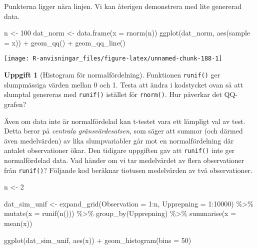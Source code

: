 \documentclass[
]{book}
\newenvironment{Shaded}{\begin{snugshade}}{\end{snugshade}}
\newcommand{\AttributeTok}[1]{\textcolor[rgb]{0.77,0.63,0.00}{#1}}
\newcommand{\DecValTok}[1]{\textcolor[rgb]{0.00,0.00,0.81}{#1}}
\newcommand{\FunctionTok}[1]{\textcolor[rgb]{0.00,0.00,0.00}{#1}}
\newcommand{\NormalTok}[1]{#1}
\newcommand{\OtherTok}[1]{\textcolor[rgb]{0.56,0.35,0.01}{#1}}
\newcommand{\SpecialCharTok}[1]{\textcolor[rgb]{0.00,0.00,0.00}{#1}}
\theoremstyle{definition}
\theoremstyle{definition}
\theoremstyle{definition}
\newtheorem{exercise}{Uppgift}[chapter]
\theoremstyle{definition}
\theoremstyle{remark}
\begin{document}
Punkterna ligger nära linjen. Vi kan återigen demonstrera med lite genererad data.

\begin{Shaded}
\begin{Highlighting}[]
\NormalTok{n }\OtherTok{\textless{}{-}} \DecValTok{100}
\NormalTok{dat\_norm }\OtherTok{\textless{}{-}} \FunctionTok{data.frame}\NormalTok{(}\AttributeTok{x =} \FunctionTok{rnorm}\NormalTok{(n))}
\FunctionTok{ggplot}\NormalTok{(dat\_norm, }\FunctionTok{aes}\NormalTok{(}\AttributeTok{sample =}\NormalTok{ x)) }\SpecialCharTok{+} \FunctionTok{geom\_qq}\NormalTok{() }\SpecialCharTok{+} \FunctionTok{geom\_qq\_line}\NormalTok{()}
\end{Highlighting}
\end{Shaded}

\begin{center}\texttt{[image: R-anvisningar\_files/figure-latex/unnamed-chunk-188-1]} \end{center}

\begin{exercise}[Histogram för normalfördelning]
Funktionen \texttt{runif()} ger slumpmässiga värden mellan 0 och 1. Testa att ändra i kodstycket ovan så att slumptal genereras med \texttt{runif()} istället för \texttt{rnorm()}. Hur påverkar det QQ-grafen?
\end{exercise}

Även om data inte är normalfördelad kan t-testet vara ett lämpligt val av test. Detta beror på \emph{centrala gränsvärdesatsen}, som säger att summor (och därmed även medelvärden) av lika slumpvariabler går mot en normalfördelning där antalet observationer ökar. Den tidigare uppgiften gav att \texttt{runif()} inte ger normalfördelad data. Vad händer om vi tar medelvärdet av flera observationer från \texttt{runif()}? Följande kod beräknar tiotusen medelvärden av två observationer.

\begin{Shaded}
\begin{Highlighting}[]
\NormalTok{n }\OtherTok{\textless{}{-}} \DecValTok{2}

\NormalTok{dat\_sim\_unif }\OtherTok{\textless{}{-}} \FunctionTok{expand\_grid}\NormalTok{(}\AttributeTok{Observation =} \DecValTok{1}\SpecialCharTok{:}\NormalTok{n, }\AttributeTok{Upprepning =} \DecValTok{1}\SpecialCharTok{:}\DecValTok{10000}\NormalTok{) }\SpecialCharTok{\%\textgreater{}\%} 
  \FunctionTok{mutate}\NormalTok{(}\AttributeTok{x =} \FunctionTok{runif}\NormalTok{(}\FunctionTok{n}\NormalTok{())) }\SpecialCharTok{\%\textgreater{}\%} 
  \FunctionTok{group\_by}\NormalTok{(Upprepning) }\SpecialCharTok{\%\textgreater{}\%} 
  \FunctionTok{summarise}\NormalTok{(}\AttributeTok{x =} \FunctionTok{mean}\NormalTok{(x))}

\FunctionTok{ggplot}\NormalTok{(dat\_sim\_unif, }\FunctionTok{aes}\NormalTok{(x)) }\SpecialCharTok{+} \FunctionTok{geom\_histogram}\NormalTok{(}\AttributeTok{bins =} \DecValTok{50}\NormalTok{)}
\end{Highlighting}
\end{Shaded}
\end{document}
